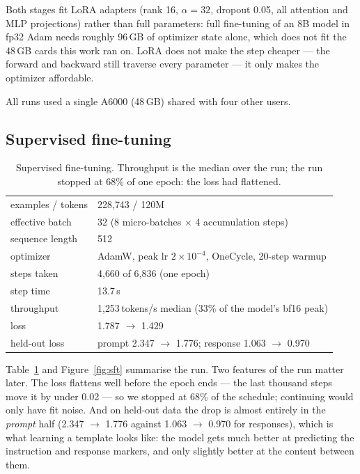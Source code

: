 \documentclass{article}
\begin{document}
Both stages fit LoRA adapters \citep{hu2021lora} (rank 16, $\alpha=32$, dropout
0.05, all attention and MLP projections) rather than full parameters: full
fine-tuning of an 8B model in fp32 Adam needs roughly 96\,GB of optimizer state
alone, which does not fit the 48\,GB cards this work ran on. LoRA does not make
the step cheaper --- the forward and backward still traverse every parameter ---
it only makes the optimizer affordable.

All runs used a single A6000 (48\,GB) shared with four other users.

\subsection{Supervised fine-tuning}

\begin{table}[t]
\centering
\caption{Supervised fine-tuning. Throughput is the median over the run; the run
stopped at 68\% of one epoch: the loss had flattened.}
\label{tab:sft}
\small
\begin{tabular}{ll}
\toprule
examples / tokens & 228{,}743 / 120M \\
effective batch & 32 (8 micro-batches $\times$ 4 accumulation steps) \\
sequence length & 512 \\
optimizer & AdamW, peak lr $2\times10^{-4}$, OneCycle, 20-step warmup \\
steps taken & 4{,}660 of 6{,}836 (one epoch) \\
step time & 13.7\,s \\
throughput & 1{,}253\,tokens/s median (33\% of the model's bf16 peak) \\
loss & 1.787 $\rightarrow$ 1.429 \\
held-out loss & prompt 2.347 $\rightarrow$ 1.776; response 1.063 $\rightarrow$ 0.970 \\
\bottomrule
\end{tabular}
\end{table}

Table~\ref{tab:sft} and Figure~\ref{fig:sft} summarise the run. Two features of
the run matter later. The loss flattens well before the epoch ends --- the last
thousand steps move it by under 0.02 --- so we stopped at 68\% of the schedule;
continuing would only have fit noise. And on held-out data the drop is
almost entirely in the \emph{prompt} half (2.347 $\rightarrow$ 1.776 against
1.063 $\rightarrow$ 0.970 for responses), which is what learning a template looks
like: the model gets much better at predicting the instruction and response
markers, and only slightly better at the content between them.
\end{document}
